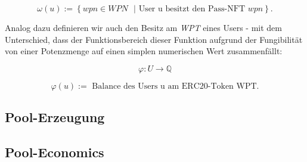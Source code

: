 \begin{Def}
\begin{equation*}
  \omega(u):= \left\{ wpn \in WPN \text{ } | \text{ User u besitzt den Pass-NFT } wpn \right\}. 
\end{equation*}

\vspace{0.2cm}

Analog dazu definieren wir auch den Besitz am \textit{WPT} eines Users - mit dem Unterschied, dass der Funktionsbereich dieser Funktion aufgrund der Fungibilität von einer Potenzmenge auf einen simplen numerischen Wert zusammenfällt:

\vspace{0.2cm}

\begin{equation*}
  \varphi : U \rightarrow \mathbb{Q}  
\end{equation*}

\begin{equation*}
  \varphi(u):= \text{ Balance des Users u am ERC20-Token WPT}. 
\end{equation*}

\end{Def}

\vspace{0.5cm}

\subsection{Pool-Erzeugung}

\vspace{0.3cm}




\vspace{0.5cm}

\subsection{Pool-Economics}

\vspace{0.3cm}





\vspace{0.5cm}

